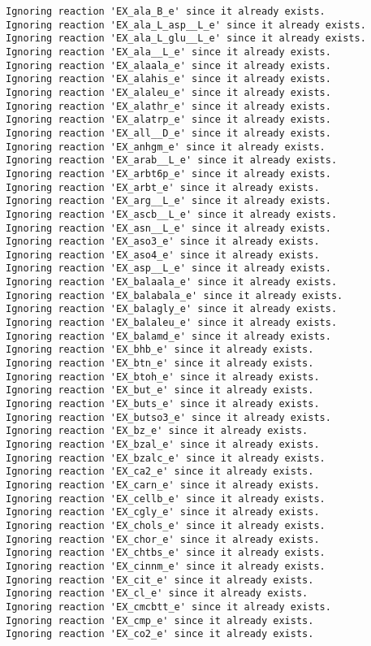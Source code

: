 \documentclass[
  letterpaper,
  DIV=11,
  numbers=noendperiod]{scrartcl}
\begin{document}
\begin{verbatim}
Ignoring reaction 'EX_ala_B_e' since it already exists.
Ignoring reaction 'EX_ala_L_asp__L_e' since it already exists.
Ignoring reaction 'EX_ala_L_glu__L_e' since it already exists.
Ignoring reaction 'EX_ala__L_e' since it already exists.
Ignoring reaction 'EX_alaala_e' since it already exists.
Ignoring reaction 'EX_alahis_e' since it already exists.
Ignoring reaction 'EX_alaleu_e' since it already exists.
Ignoring reaction 'EX_alathr_e' since it already exists.
Ignoring reaction 'EX_alatrp_e' since it already exists.
Ignoring reaction 'EX_all__D_e' since it already exists.
Ignoring reaction 'EX_anhgm_e' since it already exists.
Ignoring reaction 'EX_arab__L_e' since it already exists.
Ignoring reaction 'EX_arbt6p_e' since it already exists.
Ignoring reaction 'EX_arbt_e' since it already exists.
Ignoring reaction 'EX_arg__L_e' since it already exists.
Ignoring reaction 'EX_ascb__L_e' since it already exists.
Ignoring reaction 'EX_asn__L_e' since it already exists.
Ignoring reaction 'EX_aso3_e' since it already exists.
Ignoring reaction 'EX_aso4_e' since it already exists.
Ignoring reaction 'EX_asp__L_e' since it already exists.
Ignoring reaction 'EX_balaala_e' since it already exists.
Ignoring reaction 'EX_balabala_e' since it already exists.
Ignoring reaction 'EX_balagly_e' since it already exists.
Ignoring reaction 'EX_balaleu_e' since it already exists.
Ignoring reaction 'EX_balamd_e' since it already exists.
Ignoring reaction 'EX_bhb_e' since it already exists.
Ignoring reaction 'EX_btn_e' since it already exists.
Ignoring reaction 'EX_btoh_e' since it already exists.
Ignoring reaction 'EX_but_e' since it already exists.
Ignoring reaction 'EX_buts_e' since it already exists.
Ignoring reaction 'EX_butso3_e' since it already exists.
Ignoring reaction 'EX_bz_e' since it already exists.
Ignoring reaction 'EX_bzal_e' since it already exists.
Ignoring reaction 'EX_bzalc_e' since it already exists.
Ignoring reaction 'EX_ca2_e' since it already exists.
Ignoring reaction 'EX_carn_e' since it already exists.
Ignoring reaction 'EX_cellb_e' since it already exists.
Ignoring reaction 'EX_cgly_e' since it already exists.
Ignoring reaction 'EX_chols_e' since it already exists.
Ignoring reaction 'EX_chor_e' since it already exists.
Ignoring reaction 'EX_chtbs_e' since it already exists.
Ignoring reaction 'EX_cinnm_e' since it already exists.
Ignoring reaction 'EX_cit_e' since it already exists.
Ignoring reaction 'EX_cl_e' since it already exists.
Ignoring reaction 'EX_cmcbtt_e' since it already exists.
Ignoring reaction 'EX_cmp_e' since it already exists.
Ignoring reaction 'EX_co2_e' since it already exists.

\end{verbatim}
\end{document}
